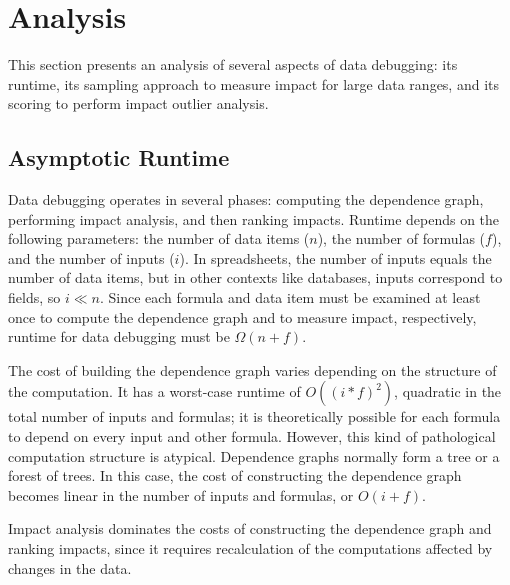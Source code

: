 \section{Analysis}
\label{sec:analysis}


This section presents an analysis of several aspects of data
debugging: its runtime, its sampling approach to measure impact for
large data ranges, and its scoring to perform impact outlier analysis.

\subsection{Asymptotic Runtime}
\label{sec:asymptotic_analysis}

Data debugging operates in several phases: computing the dependence
graph, performing impact analysis, and then ranking impacts. Runtime
depends on the following parameters: the number of data items ($n$),
the number of formulas ($f$), and the number of inputs ($i$). In
spreadsheets, the number of inputs equals the number of data items,
but in other contexts like databases, inputs correspond to fields, so
$i \ll n$. Since each formula and data item must be examined at least
once to compute the dependence graph and to measure impact,
respectively, runtime for data debugging must be 
$\Omega(n+f)$.

The cost of building the dependence graph varies depending on the
structure of the computation. It has a worst-case runtime of
$O((i*f)^2)$, quadratic in the total number of inputs and formulas; it
is theoretically possible for each formula to depend on every input
and other formula. However, this kind of pathological computation
structure is atypical. Dependence graphs normally form a tree or a
forest of trees. In this case, the cost of constructing the dependence
graph becomes linear in the number of inputs and formulas, or
$O(i+f)$.

Impact analysis dominates the costs of constructing the dependence
graph and ranking impacts, since it requires recalculation of the
computations affected by changes in the data.

